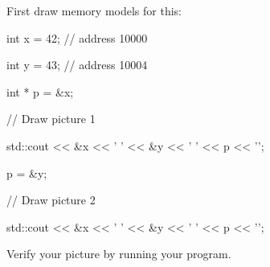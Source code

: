 First draw memory models for this:



\begin{consolethree}[escapeinside=||]

int x = 42;         // address 10000

int y = 43;         // address 10004

int * p = &x;

// Draw picture 1

std::cout << &x << ' ' << &y << ' ' << p << '\n';

p = &y;

// Draw picture 2

std::cout << &x << ' ' << &y << ' ' << p << '\n';

\end{consolethree}



Verify your picture by running your program.

